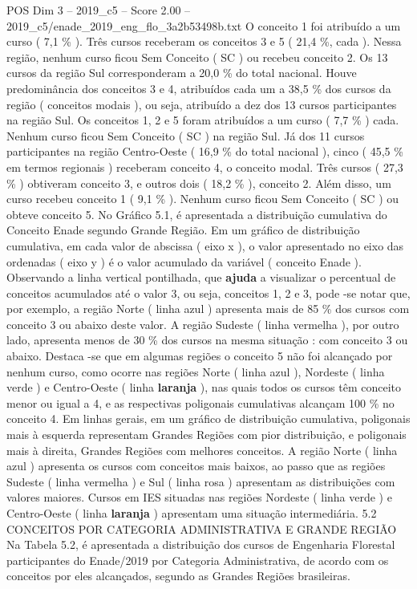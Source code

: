 \begin{textsample}{POS Dim 3 – 2019\_c5 – Score 2.00 – 2019\_c5/enade\_2019\_eng\_flo\_3a2b53498b.txt}
O conceito 1 foi atribuído a um curso ( 7,1 \% ).
Três cursos receberam os conceitos 3 e 5 ( 21,4 \%, cada ).
Nessa região, nenhum curso ficou Sem Conceito ( SC ) ou recebeu conceito 2.
Os 13 cursos da região Sul corresponderam a 20,0 \% do total nacional.
Houve predominância dos conceitos 3 e 4, atribuídos cada um a 38,5 \% dos cursos da região ( conceitos modais ), ou seja, atribuído a dez dos 13 cursos participantes na região Sul.
Os conceitos 1, 2 e 5 foram atribuídos a um curso ( 7,7 \% ) cada.
Nenhum curso ficou Sem Conceito ( SC ) na região Sul.
Já dos 11 cursos participantes na região Centro-Oeste ( 16,9 \% do total nacional ), cinco ( 45,5 \% em termos regionais ) receberam conceito 4, o conceito modal.
Três cursos ( 27,3 \% ) obtiveram conceito 3, e outros dois ( 18,2 \% ), conceito 2.
Além disso, um curso recebeu conceito 1 ( 9,1 \% ).
Nenhum curso ficou Sem Conceito ( SC ) ou obteve conceito 5.
No Gráfico 5.1, é apresentada a distribuição cumulativa do Conceito Enade segundo Grande Região.
Em um gráfico de distribuição cumulativa, em cada valor de abscissa ( eixo x ), o valor apresentado no eixo das ordenadas ( eixo y ) é o valor acumulado da variável ( conceito Enade ).
Observando a linha vertical pontilhada, que \textbf{ajuda} a visualizar o percentual de conceitos acumulados até o valor 3, ou seja, conceitos 1, 2 e 3, pode -se notar que, por exemplo, a região Norte ( linha azul ) apresenta mais de 85 \% dos cursos com conceito 3 ou abaixo deste valor.
A região Sudeste ( linha vermelha ), por outro lado, apresenta menos de 30 \% dos cursos na mesma situação : com conceito 3 ou abaixo.
Destaca -se que em algumas regiões o conceito 5 não foi alcançado por nenhum curso, como ocorre nas regiões Norte ( linha azul ), Nordeste ( linha verde ) e Centro-Oeste ( linha \textbf{laranja} ), nas quais todos os cursos têm conceito menor ou igual a 4, e as respectivas poligonais cumulativas alcançam 100 \% no conceito 4.
Em linhas gerais, em um gráfico de distribuição cumulativa, poligonais mais à esquerda representam Grandes Regiões com pior distribuição, e poligonais mais à direita, Grandes Regiões com melhores conceitos.
A região Norte ( linha azul ) apresenta os cursos com conceitos mais baixos, ao passo que as regiões Sudeste ( linha vermelha ) e Sul ( linha rosa ) apresentam as distribuições com valores maiores.
Cursos em IES situadas nas regiões Nordeste ( linha verde ) e Centro-Oeste ( linha \textbf{laranja} ) apresentam uma situação intermediária. 5.2 CONCEITOS POR CATEGORIA ADMINISTRATIVA E GRANDE REGIÃO Na Tabela 5.2, é apresentada a distribuição dos cursos de Engenharia Florestal participantes do Enade/2019 por Categoria Administrativa, de acordo com os conceitos por eles alcançados, segundo as Grandes Regiões brasileiras.

\end{textsample}
